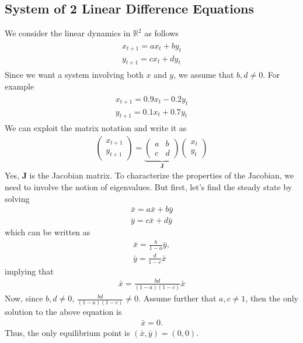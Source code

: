 \documentclass[11pt,a4paper]{book}
\theoremstyle{definition}\newtheorem{definition}{Definition}
\theoremstyle{definition}\newtheorem{fact}{Fact}
\theoremstyle{definition}\newtheorem{remark}{Remark}
\theoremstyle{definition}\newtheorem{ex}{Ex.}
\theoremstyle{definition}\newtheorem{project}{Project}
\theoremstyle{definition}\newtheorem{problem}{Problem}
\theoremstyle{definition}\newtheorem{example}{Example}
\numberwithin{theorem}{section}
\numberwithin{corollary}{chapter}
\numberwithin{assumption}{chapter}
\numberwithin{definition}{chapter}
\numberwithin{prop}{chapter}
\numberwithin{notation}{chapter}
\numberwithin{problem}{chapter}
\numberwithin{example}{chapter}
\numberwithin{fact}{chapter}
\numberwithin{ex}{chapter}
\def\R{\mathbb R}
\def\R{\mathbb R}
\def\J{\mathbf J}
\begin{document}
	\subsection{System of 2 Linear Difference Equations}
	We consider the linear dynamics in $\R^2$ as follows
	\begin{align}
		\begin{matrix}
			x_{t+1} = a x_t + b y_t \\
			y_{t+1} = c x_t + d y_t
		\end{matrix} \label{sys_lin}
	\end{align}
	Since we want a system involving both $x$ and $y$, we assume that $b, d \neq 0$. For example
	\begin{align}
		\begin{matrix}
			x_{t+1} = 0.9 x_t - 0.2 y_t \\
			y_{t+1} = 0.1 x_t + 0.7 y_t
		\end{matrix} \label{sys_lin_num}
	\end{align}
	We can exploit the matrix notation and write it as
	\begin{align}
		\begin{pmatrix}
			x_{t+1}  \\
			y_{t+1} 
		\end{pmatrix} =
		\underbrace{\begin{pmatrix}
			a & b \\ c & d
		\end{pmatrix}}_{\J}
		\begin{pmatrix}
			x_{t}  \\
			y_{t} 
		\end{pmatrix}
	\end{align}
	Yes, $\J$ is the Jacobian matrix. To characterize the properties of the Jacobian, we need to involve the notion of eigenvalues. But first, let's find the steady state by solving
	\begin{align*}
		\bar{x} = a \bar{x} + b \bar{y} \\
		\bar{y} = c \bar{x} + d \bar{y}
	\end{align*}
	which can be written as
	\begin{align*}
		\bar{x} = \frac{b}{1-a} \bar{y}, \\
		\bar{y} = \frac{d}{1-c} \bar{x}
	\end{align*}
	implying that
	\begin{align*}
		\bar{x} = \frac{bd}{(1-a)(1-c)} \bar{x}
	\end{align*}
	Now, since $b, d \neq 0$, $\frac{bd}{(1-a)(1-c)} \neq 0$. Assume further that $a, c \neq 1$, then the only solution to the above equation is
	\begin{align*}
		\bar{x} = 0.
	\end{align*}
	Thus, the only equilibrium point is $(\bar{x}, \bar{y}) = (0,0)$.
\end{document}
